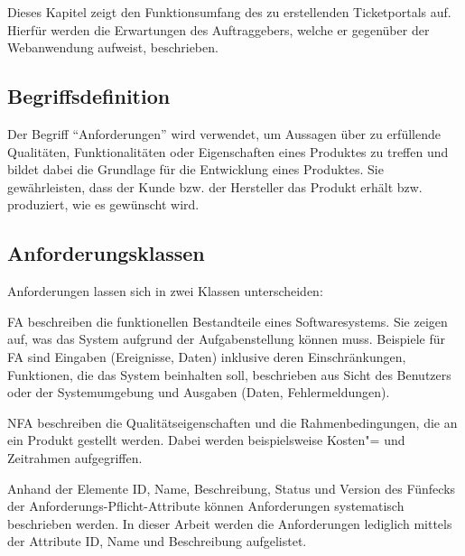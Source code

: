 Dieses Kapitel zeigt den Funktionsumfang des zu erstellenden Ticketportals auf.
Hierfür werden die Erwartungen des Auftraggebers, welche er gegenüber der Webanwendung aufweist, beschrieben.

\subsection{Begriffsdefinition}

Der Begriff \enquote{Anforderungen} wird verwendet, um Aussagen über zu erfüllende Qualitäten, Funktionalitäten oder Eigenschaften eines Produktes zu treffen und bildet dabei die Grundlage für die Entwicklung eines Produktes.
Sie gewährleisten, dass der Kunde bzw. der Hersteller das Produkt erhält bzw. produziert, wie es gewünscht wird.\unskip{}

\subsection{Anforderungsklassen}

Anforderungen lassen sich in zwei Klassen unterscheiden:

\ac{FA} beschreiben die funktionellen Bestandteile eines Softwaresystems.
Sie zeigen auf, was das System aufgrund der Aufgabenstellung können muss.
Beispiele für \ac{FA} sind Eingaben (Ereignisse, Daten) inklusive deren Einschränkungen, Funktionen, die das System beinhalten soll, beschrieben aus Sicht des Benutzers oder der Systemumgebung und Ausgaben (Daten, Fehlermeldungen).

\ac{NFA} beschreiben die Qualitätseigenschaften und die Rahmenbedingungen, die an ein Produkt gestellt werden.
Dabei werden beispielsweise Kosten"= und Zeitrahmen aufgegriffen.

Anhand der Elemente ID, Name, Beschreibung, Status und Version des Fünfecks der Anforderungs-Pflicht-Attribute können Anforderungen systematisch beschrieben werden.
In dieser Arbeit werden die Anforderungen lediglich mittels der Attribute ID, Name und Beschreibung aufgelistet.


